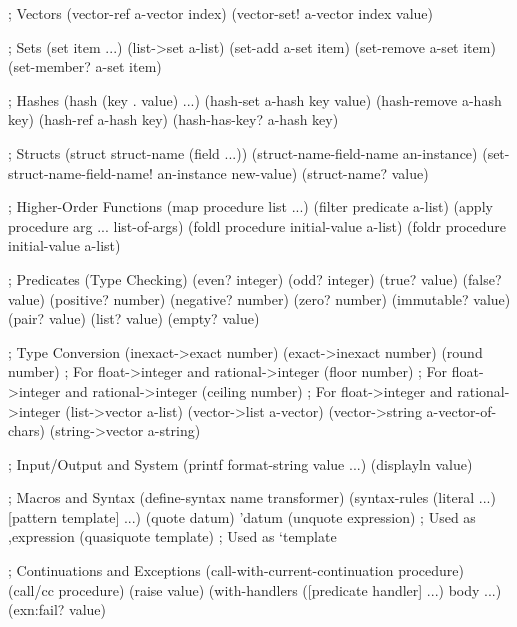 \begin{racketcode}
; Vectors
(vector-ref a-vector index)
(vector-set! a-vector index value)

; Sets
(set item ...)
(list->set a-list)
(set-add a-set item)
(set-remove a-set item)
(set-member? a-set item)

; Hashes
(hash (key . value) ...)
(hash-set a-hash key value)
(hash-remove a-hash key)
(hash-ref a-hash key)
(hash-has-key? a-hash key)

; Structs
(struct struct-name (field ...))
(struct-name-field-name an-instance)
(set-struct-name-field-name! an-instance new-value)
(struct-name? value)

; Higher-Order Functions
(map procedure list ...)
(filter predicate a-list)
(apply procedure arg ... list-of-args)
(foldl procedure initial-value a-list)
(foldr procedure initial-value a-list)

; Predicates (Type Checking)
(even? integer)
(odd? integer)
(true? value)
(false? value)
(positive? number)
(negative? number)
(zero? number)
(immutable? value)
(pair? value)
(list? value)
(empty? value)

; Type Conversion
(inexact->exact number)
(exact->inexact number)
(round number) ; For float->integer and rational->integer
(floor number) ; For float->integer and rational->integer
(ceiling number) ; For float->integer and rational->integer
(list->vector a-list)
(vector->list a-vector)
(vector->string a-vector-of-chars)
(string->vector a-string)

; Input/Output and System
(printf format-string value ...)
(displayln value)

; Macros and Syntax
(define-syntax name transformer)
(syntax-rules (literal ...) [pattern template] ...)
(quote datum)
'datum
(unquote expression) ; Used as ,expression
(quasiquote template) ; Used as `template

; Continuations and Exceptions
(call-with-current-continuation procedure)
(call/cc procedure)
(raise value)
(with-handlers ([predicate handler] ...) body ...)
(exn:fail? value)
\end{racketcode}

